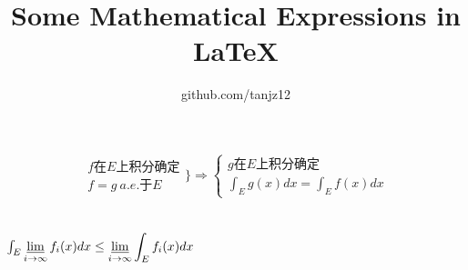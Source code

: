 \documentclass{article}
\title{Some Mathematical Expressions in LaTeX}
\author{github.com/tanjz12}
\begin{document}
\maketitle

\section{}

$$\begin{matrix}
f在E上积分确定\\
f=g\ a.e.于E
\end{matrix}
\Bigg\}
\Rightarrow
\begin{cases}
g在E上积分确定\\
\int_E g(x)dx=\int_E f(x)dx
\end{cases}$$

\section{}

$\int_E \displaystyle\varliminf_{i\rightarrow\infty}f_i(x)dx\leq \displaystyle\varliminf_{i\rightarrow\infty} \int_E f_i(x)dx$
\end{document}
